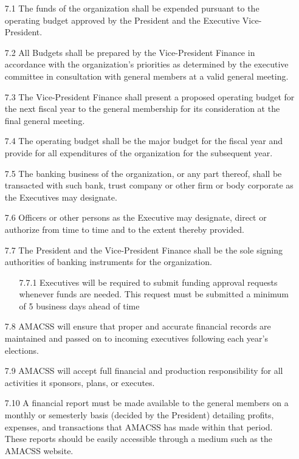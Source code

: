 \documentclass[12pt,a4paper]{article}
\begin{document}
\begin{enumerate}
\item[7.1] The funds of the organization shall be expended pursuant to the operating budget approved by the President and the Executive Vice-President.

\item[7.2] All Budgets shall be prepared by the Vice-President Finance in accordance with the organization's priorities as determined by the executive committee in consultation with general members at a valid general meeting.

\item[7.3] The Vice-President Finance shall present a proposed operating budget for the next fiscal year to the general membership for its consideration at the final general meeting.

\item[7.4] The operating budget shall be the major budget for the fiscal year and provide for all expenditures of the organization for the subsequent year.

\item[7.5] The banking business of the organization, or any part thereof, shall be transacted with such bank, trust company or other firm or body corporate as the Executives may designate.

\item[7.6] Officers or other persons as the Executive may designate, direct or authorize from time to time and to the extent thereby provided.

\item[7.7] The President and the Vice-President Finance shall be the sole signing authorities of banking instruments for the organization.

\begin{enumerate}
\item[7.7.1] Executives will be required to submit funding approval requests whenever funds are needed. This request must be submitted a minimum of 5 business days ahead of time
\end{enumerate}

\item[7.8] AMACSS will ensure that proper and accurate financial records are maintained and passed on to incoming executives following each year's elections.

\item[7.9] AMACSS will accept full financial and production responsibility for all activities it sponsors, plans, or executes.

\item[7.10] A financial report must be made available to the general members on a monthly or semesterly basis (decided by the President) detailing profits, expenses, and transactions that AMACSS has made within that period. These reports should be easily accessible through a medium such as the AMACSS website.
\end{enumerate}
\end{document}

